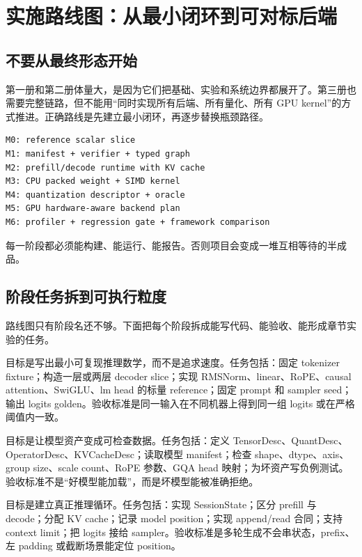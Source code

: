 \section{实施路线图：从最小闭环到可对标后端}

\subsection{不要从最终形态开始}

第一册和第二册体量大，是因为它们把基础、实验和系统边界都展开了。第三册也需要完整链路，但不能用“同时实现所有后端、所有量化、所有 GPU kernel”的方式推进。正确路线是先建立最小闭环，再逐步替换瓶颈路径。

\begin{lstlisting}[numbers=none,caption={第三册项目的实施顺序}]
M0: reference scalar slice
M1: manifest + verifier + typed graph
M2: prefill/decode runtime with KV cache
M3: CPU packed weight + SIMD kernel
M4: quantization descriptor + oracle
M5: GPU hardware-aware backend plan
M6: profiler + regression gate + framework comparison
\end{lstlisting}

每一阶段都必须能构建、能运行、能报告。否则项目会变成一堆互相等待的半成品。

\subsection{阶段任务拆到可执行粒度}

路线图只有阶段名还不够。下面把每个阶段拆成能写代码、能验收、能形成章节实验的任务。

 目标是写出最小可复现推理数学，而不是追求速度。任务包括：固定 tokenizer fixture；构造一层或两层 decoder slice；实现 RMSNorm、linear、RoPE、causal attention、SwiGLU、lm head 的标量 reference；固定 prompt 和 sampler seed；输出 logits golden。验收标准是同一输入在不同机器上得到同一组 logits 或在严格阈值内一致。

 目标是让模型资产变成可检查数据。任务包括：定义 TensorDesc、QuantDesc、OperatorDesc、KVCacheDesc；读取模型 manifest；检查 shape、dtype、axis、group size、scale count、RoPE 参数、GQA head 映射；为坏资产写负例测试。验收标准不是“好模型能加载”，而是坏模型能被准确拒绝。

 目标是建立真正推理循环。任务包括：实现 SessionState；区分 prefill 与 decode；分配 KV cache；记录 model position；实现 append/read 合同；支持 context limit；把 logits 接给 sampler。验收标准是多轮生成不会串状态，prefix、左 padding 或截断场景能定位 position。

